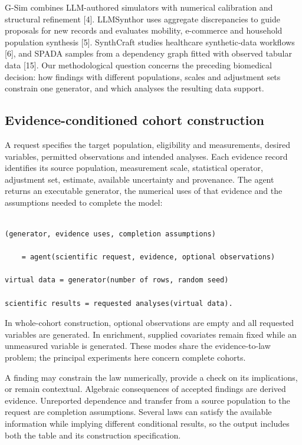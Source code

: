 \documentclass[sigconf,anonymous,review]{acmart}
\begin{document}
G-Sim combines LLM-authored simulators with numerical calibration and structural refinement [4]. LLMSynthor uses aggregate discrepancies to guide proposals for new records and evaluates mobility, e-commerce and household population synthesis [5]. SynthCraft studies healthcare synthetic-data workflows [6], and SPADA samples from a dependency graph fitted with observed tabular data [15]. Our methodological question concerns the preceding biomedical decision: how findings with different populations, scales and adjustment sets constrain one generator, and which analyses the resulting data support.


\subsection{Evidence-conditioned cohort construction}

A request specifies the target population, eligibility and measurements, desired variables, permitted observations and intended analyses. Each evidence record identifies its source population, measurement scale, statistical operator, adjustment set, estimate, available uncertainty and provenance. The agent returns an executable generator, the numerical uses of that evidence and the assumptions needed to complete the model:


\noindent\begin{minipage}{\columnwidth}

\begin{lstlisting}

(generator, evidence uses, completion assumptions)

    = agent(scientific request, evidence, optional observations)

virtual data = generator(number of rows, random seed)

scientific results = requested analyses(virtual data).

\end{lstlisting}

\end{minipage}

In whole-cohort construction, optional observations are empty and all requested variables are generated. In enrichment, supplied covariates remain fixed while an unmeasured variable is generated. These modes share the evidence-to-law problem; the principal experiments here concern complete cohorts.


A finding may constrain the law numerically, provide a check on its implications, or remain contextual. Algebraic consequences of accepted findings are derived evidence. Unreported dependence and transfer from a source population to the request are completion assumptions. Several laws can satisfy the available information while implying different conditional results, so the output includes both the table and its construction specification.
\end{document}

